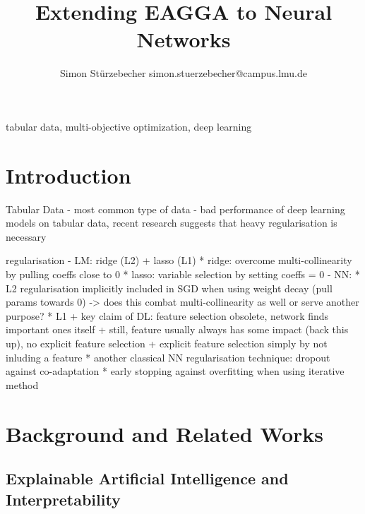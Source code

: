 \documentclass[twoside,11pt]{article}
\begin{document}
\title{Extending EAGGA to Neural Networks}

\author{\name Simon Stürzebecher \email simon.stuerzebecher@campus.lmu.de}


\maketitle

\begin{abstract}%
\end{abstract}

\begin{keywords}
  tabular data, multi-objective optimization, deep learning
\end{keywords}

\section{Introduction}
Tabular Data
- most common type of data
- bad performance of deep learning models on tabular data, recent research suggests that heavy regularisation is necessary

regularisation
- LM: ridge (L2) + lasso (L1)
  * ridge: overcome multi-collinearity by pulling coeffs close to 0
  * lasso: variable selection by setting coeffs = 0
- NN:
  * L2 regularisation implicitly included in SGD when using weight decay (pull params towards 0) -> does this combat multi-collinearity as well or serve another purpose?
  * L1
    + key claim of DL: feature selection obsolete, network finds important ones itself
    + still, feature usually always has some impact (back this up), no explicit feature selection
    + explicit feature selection simply by not inluding a feature
  * another classical NN regularisation technique: dropout against co-adaptation
  * early stopping against overfitting when using iterative method



\section{Background and Related Works}

\subsection{Explainable Artificial Intelligence and Interpretability}
\end{document}
